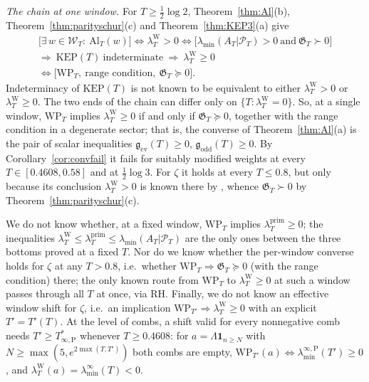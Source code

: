 \documentclass[11pt]{amsart}
\theoremstyle{definition}
\theoremstyle{remark}
\newcommand{\PT}{\mathcal P_T}
\newcommand{\lamP}{\lambda^{\mathrm{prim}}_T}
\newcommand{\lamW}{\lambda^{\mathrm W}_T}
\newcommand{\lamA}{\lambda_{\min}(A_T|\PT)}
\newcommand{\Wcl}{\mathcal W_T}
\newcommand{\laminf}{\lambda^{\infty}_{\min}}
\newcommand{\laminfP}{\lambda^{\infty,\mathrm P}_{\min}}
\begin{document}
\emph{The chain at one window.} For $T\ge\frac12\log2$, Theorem~\ref{thm:Al}(b),
Theorem~\ref{thm:parityschur}(c) and Theorem~\ref{thm:KEP3}(a) give
\begin{multline*}
\big[\exists\,w\in\Wcl:\ \mathrm{Al}_T(w)\big]\iff\lamW>0\iff\big[\lamA>0\ \text{and}\ \mathfrak G_T\succ0\big]\\
\Longrightarrow\ \mathrm{KEP}(T)\ \text{indeterminate}\ \Longrightarrow\ \lamW\ge0\\
\iff\big[\mathrm{WP}_T,\ \text{range condition},\ \mathfrak G_T\succeq0\big].
\end{multline*}
Indeterminacy of $\mathrm{KEP}(T)$ is not known to be equivalent to either $\lamW>0$ or $\lamW\ge0$. The two
ends of the chain can differ only on $\{T:\lamW=0\}$. So, at a single window, $\mathrm{WP}_T$ implies $\lamW\ge0$ if
and only if $\mathfrak G_T\succeq0$, together with the range condition in a degenerate sector; that is, the
converse of Theorem~\ref{thm:Al}(a) is the pair of scalar inequalities $\mathfrak g_{\mathrm{ev}}(T)\ge0$,
$\mathfrak g_{\mathrm{odd}}(T)\ge0$. By Corollary~\ref{cor:convfail} it fails for suitably modified weights at every
$T\in[0.4608,0.58]$ and at $\frac12\log3$. For $\zeta$ it holds at every $T\le0.8$, but only because its conclusion
$\lamW>0$ is known there by \cite[Thm.~1.2]{Zhu2026}, whence $\mathfrak G_T\succ0$ by
Theorem~\ref{thm:parityschur}(c).

We do not know whether, at a fixed window, $\mathrm{WP}_T$ implies $\lamP\ge0$; the inequalities
$\lamW\le\lamP\le\lamA$ are the only ones between the three bottoms proved at a fixed $T$. Nor do we know
whether the per-window converse holds for $\zeta$ at any $T>0.8$, i.e.\ whether
$\mathrm{WP}_T\Rightarrow\mathfrak G_T\succeq0$ (with the range condition) there; the only known route from
$\mathrm{WP}_T$ to $\lamW\ge0$ at such a window passes through all $T$ at once, via RH. Finally, we do not know an
effective window shift for $\zeta$, i.e.\ an implication $\mathrm{WP}_{T'}\Rightarrow\lamW\ge0$ with an explicit
$T'=T'(T)$. At the level of combs, a shift valid for every nonnegative comb needs $T'\ge T^*_{\infty,\mathrm P}$
whenever $T\ge0.4608$: for $a=\Lambda\mathbf 1_{n\ge N}$ with $N\ge\max(5,e^{2\max(T,T')})$ both combs are empty,
$\mathrm{WP}_{T'}(a)\iff\laminfP(T')\ge0$, and $\lambda^{\mathrm W}_T(a)=\laminf(T)<0$.
\end{document}
